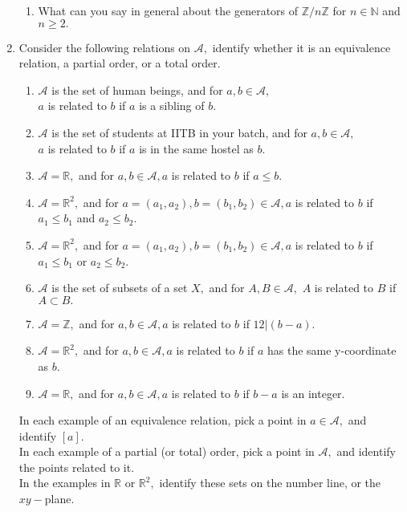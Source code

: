 \begin{enumerate}[label=(\arabic*)]
\begin{enumerate}[nosep]
		\item What can you say in general about the generators of $\mathbb{Z}/n\mathbb{Z}$ for $n \in \mathbb{N}$ and $n \ge 2.$
	\end{enumerate}
	\item Consider the following relations on $\mathcal{A},$ identify whether it is an equivalence relation, a partial order, or a total order.
	\begin{enumerate}[nosep] 
		\item $\mathcal{A}$ is the set of human beings, and for $a, b \in \mathcal{A},$\\
		$a$ is related to $b$ if $a$ is a sibling of $b.$
		\item $\mathcal{A}$ is the set of students at IITB in your batch, and for $a, b \in \mathcal{A},$\\
		$a$ is related to $b$ if $a$ is in the same hostel as $b.$
		\item $\mathcal{A} = \mathbb{R},$ and for $a, b \in \mathcal{A}, a$ is related to $b$ if $a \le b.$
		\item $\mathcal{A} = \mathbb{R}^2,$ and for $a = (a_1, a_2), b = (b_1, b_2) \in \mathcal{A}, a$ is related to $b$ if $a_1 \le b_1$ and $a_2 \le b_2.$
		\item $\mathcal{A} = \mathbb{R}^2,$ and for $a = (a_1, a_2), b = (b_1, b_2) \in \mathcal{A}, a$ is related to $b$ if $a_1 \le b_1$ or $a_2 \le b_2.$
		\item $\mathcal{A}$ is the set of subsets of a set $X,$ and for $A, B \in \mathcal{A},$ $A$ is related to $B$ if $A \subset B.$
		\item $\mathcal{A} = \mathbb{Z},$ and for $a, b \in \mathcal{A}, a$ is related to $b$ if $12|(b - a).$
		\item $\mathcal{A} = \mathbb{R}^2,$ and for $a, b \in \mathcal{A}, a$ is related to $b$ if $a$ has the same y-coordinate as $b.$
		\item $\mathcal{A} = \mathbb{R},$ and for $a, b \in \mathcal{A}, a$ is related to $b$ if $b - a$ is an integer.
	\end{enumerate}
	In each example of an equivalence relation, pick a point in $a \in \mathcal{A},$ and identify $[a].$\\
	In each example of a partial (or total) order, pick a point in $\mathcal{A},$ and identify the points related to it.\\
	In the examples in $\mathbb{R}$ or $\mathbb{R}^2,$ identify these sets on the number line, or the $xy-$plane.
\end{enumerate}

